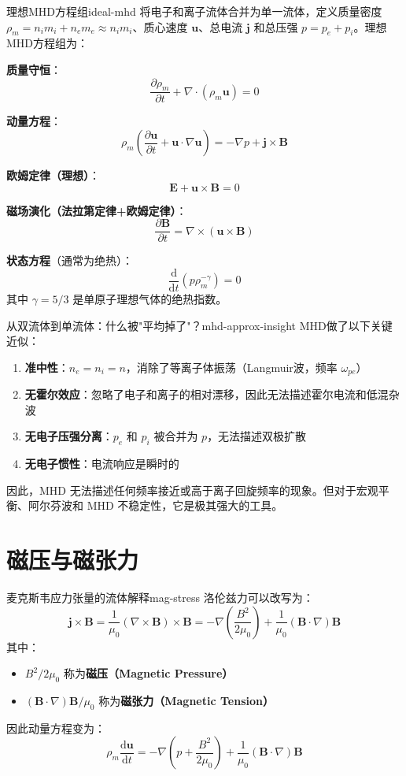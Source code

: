 \documentclass[12pt,a4paper,openany,oneside]{book}
\newcommand{\diff}{\mathrm{d}}
\newcommand{\vect}[1]{\bm{#1}}
\newcommand{\grad}{\nabla}
\newcommand{\curl}{\nabla\times}
\newcommand{\divg}{\nabla\cdot}
\newcommand{\difficulty}[1]{\marginnote{\textcolor{red}{\textbf{[#1]}}}}
\begin{document}
\begin{theorem}{理想MHD方程组}{ideal-mhd}
将电子和离子流体合并为单一流体，定义质量密度 $\rho_m = n_i m_i + n_e m_e \approx n_i m_i$、质心速度 $\vect{u}$、总电流 $\vect{j}$ 和总压强 $p = p_e + p_i$。理想MHD方程组为：

\textbf{质量守恒}：
\[
\frac{\partial\rho_m}{\partial t} + \divg(\rho_m\vect{u}) = 0
\]

\textbf{动量方程}：
\[
\rho_m\left(\frac{\partial\vect{u}}{\partial t} + \vect{u}\cdot\grad\vect{u}\right) = -\grad p + \vect{j}\times\vect{B}
\]

\textbf{欧姆定律（理想）}：
\[
\vect{E} + \vect{u}\times\vect{B} = 0
\]

\textbf{磁场演化（法拉第定律+欧姆定律）}：
\[
\frac{\partial\vect{B}}{\partial t} = \curl(\vect{u}\times\vect{B})
\]

\textbf{状态方程}（通常为绝热）：
\[
\frac{\diff}{\diff t}(p\rho_m^{-\gamma}) = 0
\]
其中 $\gamma = 5/3$ 是单原子理想气体的绝热指数。
\end{theorem}

\begin{insight}{从双流体到单流体：什么被"平均掉了"？}{mhd-approx-insight}
MHD做了以下关键近似：
\begin{enumerate}
\item \textbf{准中性}：$n_e = n_i = n$，消除了等离子体振荡（Langmuir波，频率 $\omega_{pe}$）
\item \textbf{无霍尔效应}：忽略了电子和离子的相对漂移，因此无法描述霍尔电流和低混杂波
\item \textbf{无电子压强分离}：$p_e$ 和 $p_i$ 被合并为 $p$，无法描述双极扩散
\item \textbf{无电子惯性}：电流响应是瞬时的
\end{enumerate}
因此，MHD 无法描述任何频率接近或高于离子回旋频率的现象。但对于宏观平衡、阿尔芬波和 MHD 不稳定性，它是极其强大的工具。
\end{insight}

\section{磁压与磁张力}\difficulty{基础}

\begin{theorem}{麦克斯韦应力张量的流体解释}{mag-stress}
洛伦兹力可以改写为：
\[
\vect{j}\times\vect{B} = \frac{1}{\mu_0}(\curl\vect{B})\times\vect{B} = -\grad\left(\frac{B^2}{2\mu_0}\right) + \frac{1}{\mu_0}(\vect{B}\cdot\grad)\vect{B}
\]
其中：
\begin{itemize}
\item $B^2/2\mu_0$ 称为\textbf{磁压（Magnetic Pressure）}
\item $(\vect{B}\cdot\grad)\vect{B}/\mu_0$ 称为\textbf{磁张力（Magnetic Tension）}
\end{itemize}

因此动量方程变为：
\[
\rho_m\frac{\diff\vect{u}}{\diff t} = -\grad\left(p + \frac{B^2}{2\mu_0}\right) + \frac{1}{\mu_0}(\vect{B}\cdot\grad)\vect{B}
\]
\end{theorem}
\end{document}
